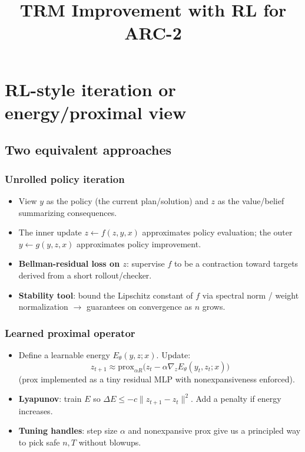 \documentclass[11pt,article]{article}
\title{\textbf{TRM Improvement with RL for ARC-2}}
\author{}
\date{}
\begin{document}
\maketitle

\section{RL-style iteration or energy/proximal view}


\subsection{Two equivalent approaches}

\subsubsection{Unrolled policy iteration}

\begin{itemize}
    \item View $y$ as the policy (the current plan/solution) and $z$ as the value/belief summarizing consequences.
    \item The inner update $z \leftarrow f(z, y, x)$ approximates policy evaluation; the outer $y \leftarrow g(y, z, x)$ approximates policy improvement.
    \item \textbf{Bellman-residual loss on $z$}: supervise $f$ to be a contraction toward targets derived from a short rollout/checker.
    \item \textbf{Stability tool}: bound the Lipschitz constant of $f$ via spectral norm / weight normalization $\rightarrow$ guarantees on convergence as $n$ grows.
\end{itemize}

\subsubsection{Learned proximal operator}

\begin{itemize}
    \item Define a learnable energy $E_\theta(y, z; x)$. Update:
    \[
    z_{t+1} \approx \text{prox}_{\alpha R}\big(z_t - \alpha \nabla_z E_\theta(y_t, z_t; x)\big)
    \]
    (prox implemented as a tiny residual MLP with nonexpansiveness enforced).
    
    \item \textbf{Lyapunov}: train $E$ so $\Delta E \le -c\|z_{t+1}-z_t\|^2$. Add a penalty if energy increases.
    
    \item \textbf{Tuning handles}: step size $\alpha$ and nonexpansive prox give us a principled way to pick safe $n,T$ without blowups.
\end{itemize}
\end{document}
